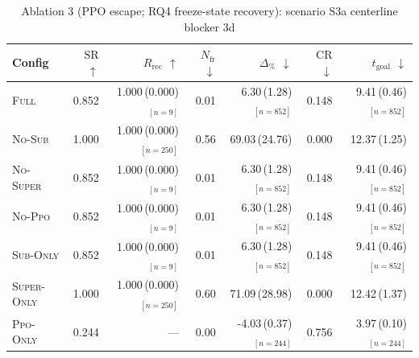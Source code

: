 \begin{table}[h]
\centering
\small
\caption{Ablation 3 (PPO escape; RQ4 freeze-state recovery): scenario S3a centerline blocker 3d}
\label{tab:abl3:S3a_centerline_blocker_3d}
\begin{tabular}{lrrrrrr}
\toprule
Config & $\mathrm{SR}$ $\uparrow$ & $R_{\mathrm{rec}}$ $\uparrow$ & $N_{\mathrm{fr}}$ $\downarrow$ & $\Delta_{\%}$ $\downarrow$ & $\mathrm{CR}$ $\downarrow$ & $t_{\mathrm{goal}}$ $\downarrow$ \\
\midrule
\textsc{Full} & 0.852 & 1.000\,(0.000)$_{[n=9]}$ & 0.01 & 6.30\,(1.28)$_{[n=852]}$ & 0.148 & 9.41\,(0.46)$_{[n=852]}$ \\
\textsc{No-Sub} & 1.000 & 1.000\,(0.000)$_{[n=250]}$ & 0.56 & 69.03\,(24.76) & 0.000 & 12.37\,(1.25) \\
\textsc{No-Super} & 0.852 & 1.000\,(0.000)$_{[n=9]}$ & 0.01 & 6.30\,(1.28)$_{[n=852]}$ & 0.148 & 9.41\,(0.46)$_{[n=852]}$ \\
\textsc{No-Ppo} & 0.852 & 1.000\,(0.000)$_{[n=9]}$ & 0.01 & 6.30\,(1.28)$_{[n=852]}$ & 0.148 & 9.41\,(0.46)$_{[n=852]}$ \\
\textsc{Sub-Only} & 0.852 & 1.000\,(0.000)$_{[n=9]}$ & 0.01 & 6.30\,(1.28)$_{[n=852]}$ & 0.148 & 9.41\,(0.46)$_{[n=852]}$ \\
\textsc{Super-Only} & 1.000 & 1.000\,(0.000)$_{[n=250]}$ & 0.60 & 71.09\,(28.98) & 0.000 & 12.42\,(1.37) \\
\textsc{Ppo-Only} & 0.244 & --- & 0.00 & -4.03\,(0.37)$_{[n=244]}$ & 0.756 & 3.97\,(0.10)$_{[n=244]}$ \\
\bottomrule
\end{tabular}
\end{table}

